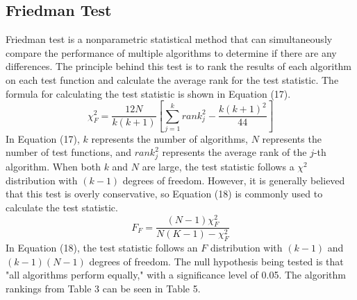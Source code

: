 \documentclass[preprint,review,compress,12pt]{elsarticle}
\begin{document}
\subsection{Friedman Test}
Friedman test\cite{demvsar2006statistical,ma2023performance} is a nonparametric statistical method that can simultaneously compare the performance of multiple algorithms to determine if there are any differences. The principle behind this test is to rank the results of each algorithm on each test function and calculate the average rank for the test statistic. The formula for calculating the test statistic is shown in Equation (17).
\begin{equation}
    \chi _F^2 = \frac{12N}{k(k+1)}\left [  {\textstyle \sum_{j=1}^{k}rank_j^2-\frac{k(k+1)^2}{44} }  \right ]  
\end{equation}
In Equation (17), $k$ represents the number of algorithms, $N$ represents the number of test functions, and $rank_j^2$ represents the average rank of the $j$-th algorithm. When both $k$ and $N$ are large, the test statistic follows a $\chi ^2$ distribution with $(k-1)$ degrees of freedom. However, it is generally believed that this test is overly conservative\cite{imanapproximations}, so Equation (18) is commonly used to calculate the test statistic.
\begin{equation}
F _F = \frac{(N-1)\chi_F ^2}{N(K-1)-\chi_F ^2 } 
\end{equation}
In Equation (18), the test statistic follows an $F$ distribution with $(k-1)$ and $(k-1)(N-1)$ degrees of freedom. The null hypothesis being tested is that "all algorithms perform equally," with a significance level of 0.05. The algorithm rankings from Table 3 can be seen in Table 5.
\end{document}
